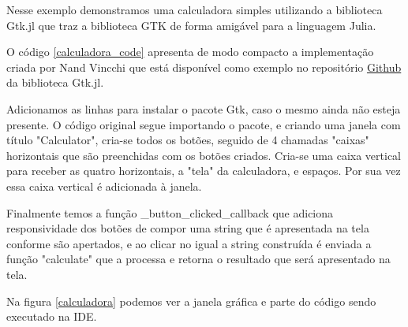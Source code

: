 Nesse exemplo demonstramos uma calculadora simples utilizando a biblioteca Gtk.jl que traz a biblioteca GTK de forma amigável para a linguagem Julia. 

O código \ref{calculadora_code} apresenta de modo compacto a implementação criada por Nand Vincchi que está disponível como exemplo no repositório \href{https://github.com/JuliaGraphics/Gtk.jl/blob/master/example/calculator.jl}{Github} da biblioteca Gtk.jl. 

Adicionamos as linhas para instalar o pacote Gtk, caso o mesmo ainda não esteja presente. O código original segue importando o pacote, e criando uma janela com título "Calculator", cria-se todos os botões, seguido de 4 chamadas "caixas" horizontais que são preenchidas com os botões criados. Cria-se uma caixa vertical para receber as quatro horizontais, a "tela" da calculadora, e espaços. Por sua vez essa caixa vertical é adicionada à janela.

Finalmente temos a função \_button\_clicked\_callback que adiciona responsividade dos botões de compor uma string que é apresentada na tela conforme são apertados, e ao clicar no igual a string construída é enviada a função "calculate" que a processa e retorna o resultado que será apresentado na tela.

Na figura \ref{calculadora} podemos ver a janela gráfica e parte do código sendo executado na IDE. 

